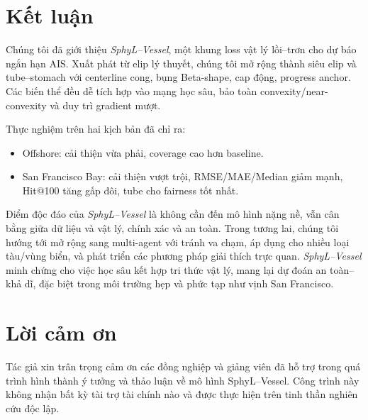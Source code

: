 \documentclass{IEEEtran}
\begin{document}
\section{Kết luận}
Chúng tôi đã giới thiệu \emph{SphyL--Vessel}, 
một khung loss vật lý lồi--trơn cho dự báo ngắn hạn AIS. 
Xuất phát từ elip lý thuyết, chúng tôi mở rộng thành siêu elip và tube--stomach 
với centerline cong, bụng Beta-shape, cap động, progress anchor. 
Các biến thể đều dễ tích hợp vào mạng học sâu, bảo toàn convexity/near-convexity 
và duy trì gradient mượt.

Thực nghiệm trên hai kịch bản đã chỉ ra:
\begin{itemize}
  \item Offshore: cải thiện vừa phải, coverage cao hơn baseline.
  \item San Francisco Bay: cải thiện vượt trội, RMSE/MAE/Median giảm mạnh, Hit@100 tăng gấp đôi, tube cho fairness tốt nhất.
\end{itemize}

Điểm độc đáo của \emph{SphyL--Vessel} là không cần đến mô hình nặng nề, 
vẫn cân bằng giữa dữ liệu và vật lý, chính xác và an toàn. 
Trong tương lai, chúng tôi hướng tới mở rộng sang multi-agent với tránh va chạm, 
áp dụng cho nhiều loại tàu/vùng biển, 
và phát triển các phương pháp giải thích trực quan. 
\emph{SphyL--Vessel} minh chứng cho việc học sâu kết hợp tri thức vật lý, 
mang lại dự đoán an toàn--khả dĩ, đặc biệt trong môi trường hẹp và phức tạp như vịnh San Francisco.



\section*{Lời cảm ơn}
Tác giả xin trân trọng cảm ơn các đồng nghiệp và giảng viên đã hỗ trợ 
trong quá trình hình thành ý tưởng và thảo luận về mô hình SphyL--Vessel. 
Công trình này không nhận bất kỳ tài trợ tài chính nào và được thực hiện 
trên tinh thần nghiên cứu độc lập.




\end{document}
